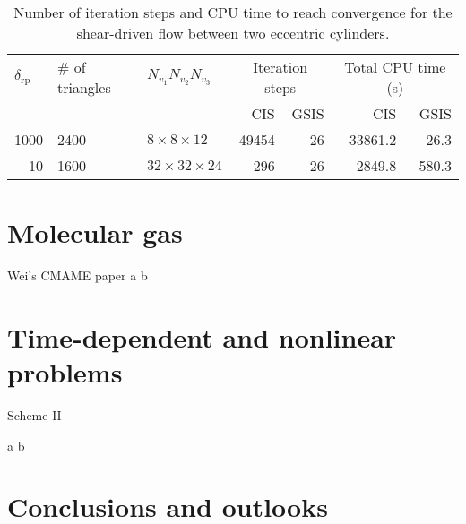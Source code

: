 \begin{table}[t]
	\centering
	\caption{Number of iteration steps and CPU time to reach convergence for the shear-driven flow between two eccentric cylinders. }
	\begin{tabular}{rllrrrr}
		\hline
		\multicolumn{1}{l}{$\delta_\text{rp}$} & \# of triangles & $N_{v_1}N_{v_2}N_{v_3}$    & \multicolumn{2}{c}{Iteration steps} & \multicolumn{2}{c}{Total CPU time (s)} \\ 
		&       &       & \multicolumn{1}{r}{CIS} & \multicolumn{1}{r}{GSIS} & \multicolumn{1}{r}{CIS} & \multicolumn{1}{r}{GSIS}\\ 
		\hline
		1000   & 2400 & $8\times8\times 12$ & 49454    & 26    &     33861.2  & 26.3 \\
		10  & 1600 & $32\times32\times 24 $& 296    & 26    &   2849.8    & 580.3 \\ 
		\hline
	\end{tabular}%
	\label{tab:iteration2}%
\end{table}














\section{Molecular gas}

Wei's CMAME paper
\newpage
a
\newpage
b
\newpage


\section{Time-dependent and nonlinear problems}

Scheme II

\newpage
a
\newpage
b
\newpage


\section{Conclusions and outlooks}\label{sec:summary}


